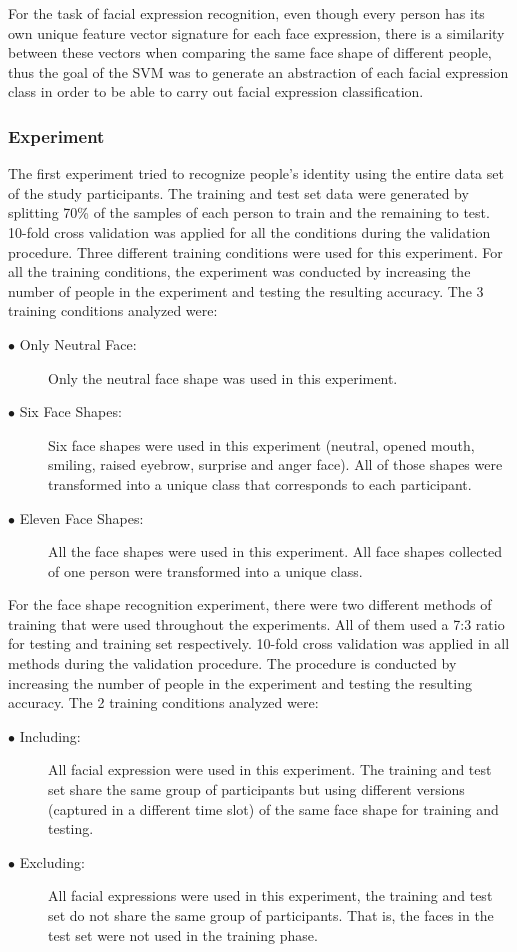 \documentclass[]{article}
\begin{document}
For the task of facial expression recognition, even though every person has its own unique feature vector signature for
each face expression, there is a similarity between these vectors when comparing the same face shape of different
people, thus the goal of the SVM was to generate an abstraction of each facial expression class in order to be able to
carry out facial expression classification.


\subsubsection{Experiment}\label{experimentsSubsection}
The first experiment tried to recognize people's identity using the entire data set of the study participants. The
training and test set data were generated by splitting 70\% of the samples of each person to train and the remaining to
test. 10-fold cross validation was applied for all the conditions during the validation procedure.
Three different training conditions were used for this experiment. For all the training conditions, the experiment was
conducted by increasing the number of people in the experiment and testing the resulting accuracy. The 3 training
conditions analyzed were:

\begin{description}
	\item[$\bullet$ Only Neutral Face:] Only the neutral face shape was used in this
	experiment.   
	\item[$\bullet$ Six Face Shapes:] Six face shapes were used in this experiment (neutral,
	opened mouth, smiling, raised eyebrow, surprise and anger face). All of those
	shapes were transformed into a unique class that corresponds to each
	participant. 
	\item[$\bullet$ Eleven Face Shapes:] All the face shapes were used in this experiment. All
	face shapes collected of one person were transformed into a unique class. 
\end{description}

For the face shape recognition experiment, there were two different methods of training that were used throughout the
experiments. All of them used a 7:3 ratio for testing and training set respectively. 10-fold cross validation was
applied in all methods during the validation procedure. The procedure is conducted
by increasing the number of people in the experiment and testing the resulting
accuracy. The 2 training conditions analyzed were:

\begin{description}
	\item[$\bullet$ Including:] All facial expression were used in this experiment.
	The training and test set share the same group of participants but using
	different  versions (captured in a different time slot) of the same face shape
	for training and testing. 
	\item[$\bullet$ Excluding:] All facial expressions were used in this experiment,
	the training and test set do not  share the same group of participants. That is, the faces in the test set were not used
	in the training phase.
\end{description}
\end{document}
